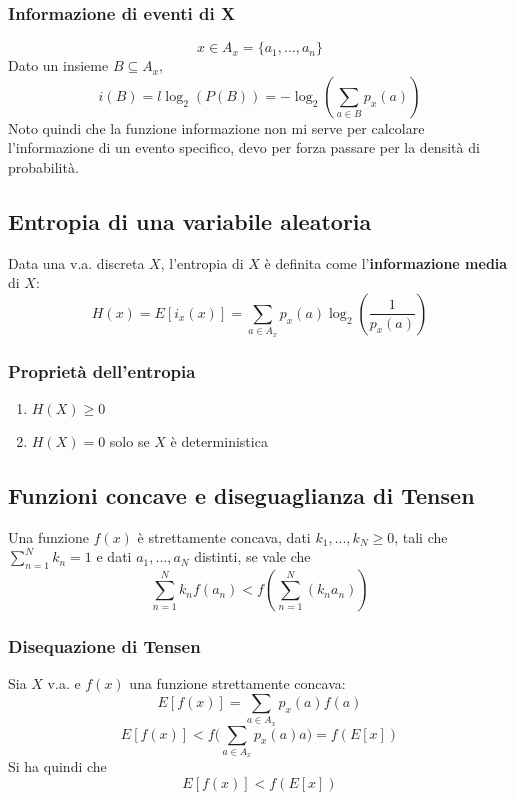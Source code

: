 \documentclass{article}
\begin{document}
\subsubsection{Informazione di eventi di X}
$$x\in A_x=\{a_1,...,a_n\}$$
Dato un insieme $B\subseteq A_x$,
$$i(B)=l\log_2(P(B))=-\log_2(\sum_{a\in B}p_x(a))$$
Noto quindi che la funzione informazione non mi serve per calcolare l'informazione di un evento specifico, devo per forza passare per la densità di probabilità.\\

\subsection{Entropia di una variabile aleatoria}
Data una v.a. discreta $X$, l'entropia di $X$ è definita come l'\textbf{informazione media} di $X$:
$$H(x)=E[i_x(x)]=\sum_{a\in A_x}p_x(a)\log_2(\frac{1}{p_x(a)})$$

\subsubsection{Proprietà dell'entropia}
\begin{enumerate}
	\item $H(X)\geq0$
	\item $H(X)=0$ solo se $X$ è deterministica
\end{enumerate}

\subsection{Funzioni concave e diseguaglianza di Tensen}
Una funzione $f(x)$ è strettamente concava, dati $k_1,...,k_N\geq0$, tali che $\sum_{n=1}^Nk_n=1$ e dati $a_1,...,a_N$ distinti, se vale che
$$\sum_{n=1}^Nk_nf(a_n)<f(\sum_{n=1}^N(k_na_n))$$

\subsubsection{Disequazione di Tensen}
Sia $X$ v.a. e $f(x)$ una funzione strettamente concava:
$$E[f(x)]=\sum_{a\in A_x}p_x(a)f(a)$$
$$E[f(x)]<f\biggl(\sum_{a\in A_x}p_x(a)a\biggl)=f(E[x])$$
Si ha quindi che
$$E[f(x)]<f(E[x])$$
\end{document}

